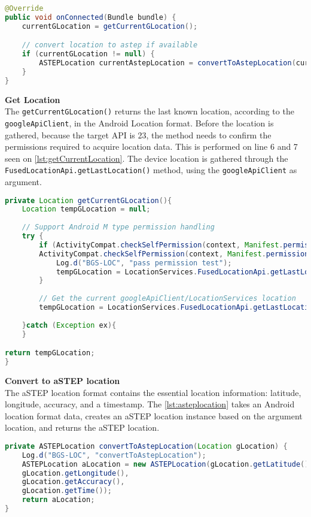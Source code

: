 \begin{lstlisting}[caption={onConnected()},label={lst:onconnected},language=Java]
@Override
public void onConnected(Bundle bundle) {
	currentGLocation = getCurrentGLocation();

	// convert location to astep if available
	if (currentGLocation != null) {
		ASTEPLocation currentAstepLocation = convertToAstepLocation(currentGLocation);
	}
}
\end{lstlisting}


\textbf{Get Location}\\
The \texttt{getCurrentGLocation()} returns the last known location, according to the \texttt{googleApiClient}, in the Android Location format.
Before the location is gathered, because the target API is 23, the method needs to confirm the permissions required to acquire location data.
This is performed on line 6 and 7 seen on \ref{lst:getCurrentLocation}.
The device location is gathered through the \texttt{FusedLocationApi.getLastLocation()} method, using the \texttt{googleApiClient} as argument.

\begin{lstlisting}[caption={getCurrentLocation},label={lst:getCurrentLocation},language=Java]
private Location getCurrentGLocation(){
	Location tempGLocation = null;
	
	// Support Android M type permission handling
	try {
		if (ActivityCompat.checkSelfPermission(context, Manifest.permission.ACCESS_FINE_LOCATION) != PackageManager.PERMISSION_GRANTED &&
		ActivityCompat.checkSelfPermission(context, Manifest.permission.ACCESS_COARSE_LOCATION) != PackageManager.PERMISSION_GRANTED) {
			Log.d("BGS-LOC", "pass permission test");
			tempGLocation = LocationServices.FusedLocationApi.getLastLocation(googleApiClient);
		}
		
		// Get the current googleApiClient/LocationServices location
		tempGLocation = LocationServices.FusedLocationApi.getLastLocation(googleApiClient);
		
	}catch (Exception ex){
	}

return tempGLocation;
}
\end{lstlisting}

\textbf{Convert to aSTEP location}\\
The aSTEP location format contains the essential location information: latitude, longitude, accuracy, and a timestamp.
The \ref{lst:asteplocation} takes an Android location format data, creates an aSTEP location instance based on the argument location, and returns the aSTEP location.

\begin{lstlisting}[caption={ASTEPLocation()},label={lst:asteplocation},language=Java]
private ASTEPLocation convertToAstepLocation(Location gLocation) {
	Log.d("BGS-LOC", "convertToAstepLocation");
	ASTEPLocation aLocation = new ASTEPLocation(gLocation.getLatitude(),
	gLocation.getLongitude(),
	gLocation.getAccuracy(),
	gLocation.getTime());
	return aLocation;
}
\end{lstlisting}


